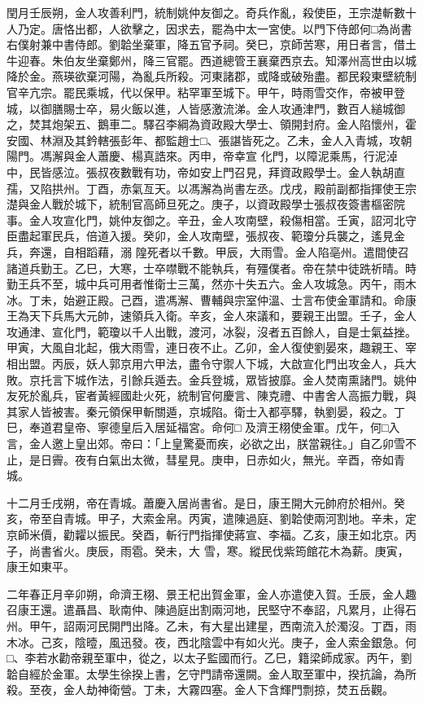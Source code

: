\begin{pinyinscope}
 閏月壬辰朔，金人攻善利門，統制姚仲友御之。奇兵作亂，殺使臣，王宗濋斬數十人乃定。唐恪出都，人欲擊之，因求去，罷為中太一宮使。以門下侍郎何□為尚書右僕射兼中書侍郎。劉韐坐棄軍，降五官予祠。癸巳，京師苦寒，用日者言，借土牛迎春。朱伯友坐棄鄭州，降三官罷。西道總管王襄棄西京去。知澤州高世由以城
 降於金。燕瑛欲棄河陽，為亂兵所殺。河東諸郡，或降或破殆盡。都民殺東壁統制官辛亢宗。罷民乘城，代以保甲。粘罕軍至城下。甲午，時雨雪交作，帝被甲登城，以御膳賜士卒，易火飯以進，人皆感激流涕。金人攻通津門，數百人縋城御之，焚其炮架五、鵝車二。驛召李綱為資政殿大學士、領開封府。金人陷懷州，霍安國、林淵及其鈐轄張彭年、都監趙士□、張諶皆死之。乙未，金人入青城，攻朝陽門。馮澥與金人蕭慶、楊真誥來。丙申，帝幸宣
 化門，以障泥乘馬，行泥淖中，民皆感泣。張叔夜數戰有功，帝如安上門召見，拜資政殿學士。金人執胡直孺，又陷拱州。丁酉，赤氣亙天。以馮澥為尚書左丞。戊戌，殿前副都指揮使王宗濋與金人戰於城下，統制官高師旦死之。庚子，以資政殿學士張叔夜簽書樞密院事。金人攻宣化門，姚仲友御之。辛丑，金人攻南壁，殺傷相當。壬寅，詔河北守臣盡起軍民兵，倍道入援。癸卯，金人攻南壁，張叔夜、範瓊分兵襲之，遙見金兵，奔還，自相蹈藉，溺
 隍死者以千數。甲辰，大雨雪。金人陷亳州。遣間使召諸道兵勤王。乙巳，大寒，士卒噤戰不能執兵，有殭僕者。帝在禁中徒跣祈晴。時勤王兵不至，城中兵可用者惟衛士三萬，然亦十失五六。金人攻城急。丙午，雨木冰。丁未，始避正殿。己酉，遣馮澥、曹輔與宗室仲溫、士言布使金軍請和。命康王為天下兵馬大元帥，速領兵入衛。辛亥，金人來議和，要親王出盟。壬子，金人攻通津、宣化門，範瓊以千人出戰，渡河，冰裂，沒者五百餘人，自是士氣益挫。
 甲寅，大風自北起，俄大雨雪，連日夜不止。乙卯，金人復使劉晏來，趣親王、宰相出盟。丙辰，妖人郭京用六甲法，盡令守禦人下城，大啟宣化門出攻金人，兵大敗。京托言下城作法，引餘兵遁去。金兵登城，眾皆披靡。金人焚南熏諸門。姚仲友死於亂兵，宦者黃經國赴火死，統制官何慶言、陳克禮、中書舍人高振力戰，與其家人皆被害。秦元領保甲斬關遁，京城陷。衛士入都亭驛，執劉晏，殺之。丁巳，奉道君皇帝、寧德皇后入居延福宮。命何□
 及濟王栩使金軍。戊午，何□入言，金人邀上皇出郊。帝曰：「上皇驚憂而疾，必欲之出，朕當親往。」自乙卯雪不止，是日霽。夜有白氣出太微，彗星見。庚申，日赤如火，無光。辛酉，帝如青城。



 十二月壬戌朔，帝在青城。蕭慶入居尚書省。是日，康王開大元帥府於相州。癸亥，帝至自青城。甲子，大索金帛。丙寅，遣陳過庭、劉韐使兩河割地。辛未，定京師米價，勸糶以振民。癸酉，斬行門指揮使蔣宣、李福。乙亥，康王如北京。丙子，尚書省火。庚辰，雨雹。癸未，大
 雪，寒。縱民伐紫筠館花木為薪。庚寅，康王如東平。



 二年春正月辛卯朔，命濟王栩、景王杞出賀金軍，金人亦遣使入賀。壬辰，金人趣召康王還。遣聶昌、耿南仲、陳過庭出割兩河地，民堅守不奉詔，凡累月，止得石州。甲午，詔兩河民開門出降。乙未，有大星出建星，西南流入於濁沒。丁酉，雨木冰。己亥，陰曀，風迅發。夜，西北陰雲中有如火光。庚子，金人索金銀急。何□、李若水勸帝親至軍中，從之，以太子監國而行。乙巳，籍梁師成家。丙午，劉
 韐自經於金軍。太學生徐揆上書，乞守門請帝還闕。金人取至軍中，揆抗論，為所殺。至夜，金人劫神衛營。丁未，大霧四塞。金人下含輝門剽掠，焚五岳觀。




\end{pinyinscope}
